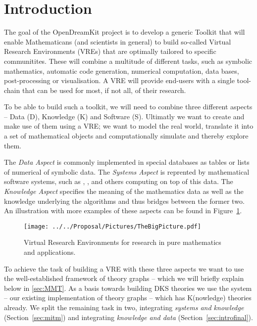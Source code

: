 \section{Introduction}\label{sec:intro}

The goal of the OpenDreamKit project \cite{ODKproposal:on} is to develop a generic Toolkit
that will enable Mathematicans (and scientists in general) to build so-called Virtual
Research Environments (VREs) that are optimally tailored to specific communitites. These
will combine a multitude of different tasks, such as symbolic mathematics, automatic code
generation, numerical computation, data bases, post-processing or visualisation. A VRE
will provide end-users with a single tool-chain that can be used for most, if not all, of
their research.

To be able to build such a toolkit, we will need to combine three different aspects --
Data (D), Knowledge (K) and Software (S). Ultimatly we want to create and make use of them
using a VRE; we want to model the real world, translate it into a set of mathematical
objects and computationally simulate and thereby explore them.

The \emph{Data Aspect} is commonly implemented in special databases as tables or lists of
numerical of symbolic data. The \emph{Systems Aspect} is reprented by mathematical
software systems, such as \GAP, \Sage, and others computing on top of this data. The
\emph{Knowledge Aspect} specifies the meaning of the mathematics data as well as the
knowledge underlying the algorithms and thus bridges between the former two. An
illustration with more examples of these aspects can be found in
Figure~\ref{fig:thebigpicture}.

\begin{figure}[H]\centering
  \texttt{[image: ../../Proposal/Pictures/TheBigPicture.pdf]}
  \caption{Virtual Research Environments for research in pure
    mathematics and applications.}
  \label{fig:thebigpicture}
\end{figure}

To achieve the task of building a VRE with these three aspects we want to use the
well-established framework of theory graphs -- which we will briefly explain below in
\ref{sec:MMT}. As a basis towards building DKS theories we use the \MMT system -- our
existing implementation of theory graphs -- which has K(nowledge) theories already. We
split the remaining task in two, integrating \textit{systems and knowledge}
(Section~\ref{sec:mitm}) and integrating \textit{knowledge and data}
(Section~\ref{sec:introfinal}).


